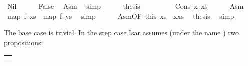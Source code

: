 \begin{isabellebody}
\ Nil\isanewline
\ \ \ \ \isamarkupfalse%
\ False\ \isamarkupfalse%
\ Asm{}{}{}\ \isamarkupfalse%
\ simp\isanewline
\ \ \ \ \isamarkupfalse%
\ {}thesis\ \isamarkupfalse%
\isanewline
\ \ \isamarkupfalse%
\isanewline
\ \ \ \ \isamarkupfalse%
\ {}Cons\ x\ xs{}{}\isanewline
\ \ \ \ \isamarkupfalse%
\ Asm{}{}{}\ \isamarkupfalse%
\ {}map\ f\ xs{}\ {}\ map\ f\ ys{}\ \isamarkupfalse%
\ simp\isanewline
\ \ \ \ \isamarkupfalse%
\ Asm{}{}{}{}OF\ this{}\ {}xs\ {}\ x{}xs{}{}\ \isamarkupfalse%
\ {}thesis\ \isamarkupfalse%
\ simp\isanewline
\ \ \isamarkupfalse%
\isanewline
{}\isamarkupfalse%
%
\endisatagproof
{\isafoldproof}%
%
\isadelimproof
%
\endisadelimproof
%
\begin{isamarkuptext}%
\noindent
The base case is trivial. In the step case Isar assumes
(under the name ) two propositions:
\begin{center}
\begin{tabular}{l}
\isa{map\ f\ {\isaliteral{3F}{\isacharquery}}xs\ {\isaliteral{3D}{\isacharequal}}\ map\ f\ ys\ {\isaliteral{5C3C4C6F6E6772696768746172726F773E}{\isasymLongrightarrow}}\ length\ {\isaliteral{3F}{\isacharquery}}xs\ {\isaliteral{3D}{\isacharequal}}\ length\ ys}\\
\isa{map\ f\ xs\ {\isaliteral{3D}{\isacharequal}}\ map\ f\ {\isaliteral{28}{\isacharparenleft}}y\ {\isaliteral{23}{\isacharhash}}\ ys{\isaliteral{29}{\isacharparenright}}}
\end{tabular}
\end{center}

\end{isamarkuptext}
\end{isabellebody}
